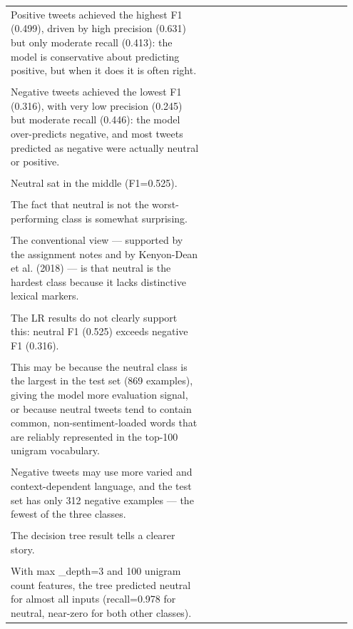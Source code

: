 \documentclass[11pt]{article}
\begin{document}
\begin{longtable}{|p{0.55\linewidth}|p{0.40\linewidth}|}
\hline
\rule{0pt}{3.5cm} & \\
\hline
Positive tweets achieved the highest F1 (0.499), driven by high precision (0.631) but only moderate recall (0.413): the model is conservative about predicting positive, but when it does it is often right. & \\[2pt]
\hline
\rule{0pt}{3.5cm} & \\
\hline
Negative tweets achieved the lowest F1 (0.316), with very low precision (0.245) but moderate recall (0.446): the model over-predicts negative, and most tweets predicted as negative were actually neutral or positive. & \\[2pt]
\hline
\rule{0pt}{3.5cm} & \\
\hline
Neutral sat in the middle (F1=0.525). & \\[2pt]
\hline
\rule{0pt}{3.5cm} & \\
\hline
The fact that neutral is not the worst-performing class is somewhat surprising. & \\[2pt]
\hline
\rule{0pt}{3.5cm} & \\
\hline
The conventional view --- supported by the assignment notes and by Kenyon-Dean et al. (2018) --- is that neutral is the hardest class because it lacks distinctive lexical markers. & \\[2pt]
\hline
\rule{0pt}{3.5cm} & \\
\hline
The LR results do not clearly support this: neutral F1 (0.525) exceeds negative F1 (0.316). & \\[2pt]
\hline
\rule{0pt}{3.5cm} & \\
\hline
This may be because the neutral class is the largest in the test set (869 examples), giving the model more evaluation signal, or because neutral tweets tend to contain common, non-sentiment-loaded words that are reliably represented in the top-100 unigram vocabulary. & \\[2pt]
\hline
\rule{0pt}{3.5cm} & \\
\hline
Negative tweets may use more varied and context-dependent language, and the test set has only 312 negative examples --- the fewest of the three classes. & \\[2pt]
\hline
\rule{0pt}{3.5cm} & \\
\hline
The decision tree result tells a clearer story. & \\[2pt]
\hline
\rule{0pt}{3.5cm} & \\
\hline
With max \_depth=3 and 100 unigram count features, the tree predicted neutral for almost all inputs (recall=0.978 for neutral, near-zero for both other classes). & \\[2pt]

\end{longtable}
\end{document}

